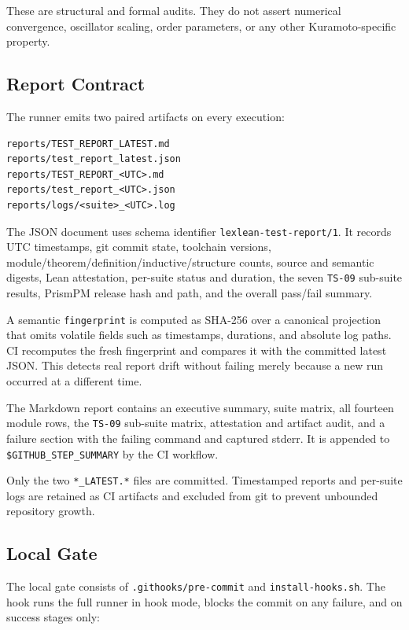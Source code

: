 \documentclass[11pt]{article}
\begin{document}
These are structural and formal audits. They do not assert numerical convergence, oscillator scaling,
order parameters, or any other Kuramoto-specific property.

\subsection{Report Contract}

The runner emits two paired artifacts on every execution:

\begin{lstlisting}
reports/TEST_REPORT_LATEST.md
reports/test_report_latest.json
reports/TEST_REPORT_<UTC>.md
reports/test_report_<UTC>.json
reports/logs/<suite>_<UTC>.log
\end{lstlisting}

The JSON document uses schema identifier \texttt{lexlean-test-report/1}. It records UTC timestamps,
git commit state, toolchain versions, module/theorem/definition/inductive/structure counts, source
and semantic digests, Lean attestation, per-suite status and duration, the seven \texttt{TS-09}
sub-suite results, PrismPM release hash and path, and the overall pass/fail summary.

A semantic \texttt{fingerprint} is computed as SHA-256 over a canonical projection that omits
volatile fields such as timestamps, durations, and absolute log paths. CI recomputes the fresh
fingerprint and compares it with the committed latest JSON. This detects real report drift without
failing merely because a new run occurred at a different time.

The Markdown report contains an executive summary, suite matrix, all fourteen module rows, the
\texttt{TS-09} sub-suite matrix, attestation and artifact audit, and a failure section with the
failing command and captured stderr. It is appended to \texttt{\$GITHUB\_STEP\_SUMMARY} by the CI
workflow.

Only the two \texttt{*\_LATEST.*} files are committed. Timestamped reports and per-suite logs are
retained as CI artifacts and excluded from git to prevent unbounded repository growth.

\subsection{Local Gate}

The local gate consists of \texttt{.githooks/pre-commit} and \texttt{install-hooks.sh}. The hook runs
the full runner in hook mode, blocks the commit on any failure, and on success stages only:
\end{document}
